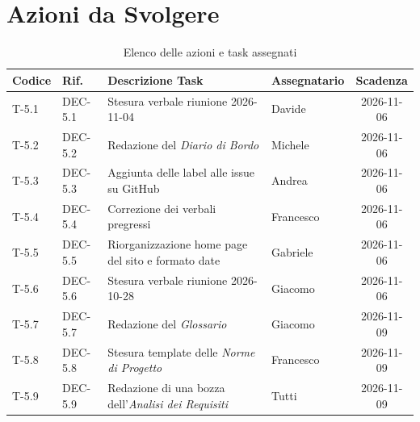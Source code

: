 \documentclass[11pt, a4paper]{article}
\begin{document}
\section{Azioni da Svolgere}

\begin{table}[htbp]
\centering
\caption{Elenco delle azioni e task assegnati}
\label{tab:azioni}
\begin{tabularx}{\textwidth}{l l X l c}
\toprule
\textbf{Codice} & \textbf{Rif.} & \textbf{Descrizione Task} & \textbf{Assegnatario} & \textbf{Scadenza} \\
\midrule
T-5.1 & DEC-5.1 & Stesura verbale riunione 2026-11-04 & Davide & 2026-11-06 \\
T-5.2 & DEC-5.2 & Redazione del \textit{Diario di Bordo} & Michele & 2026-11-06 \\
T-5.3 & DEC-5.3 & Aggiunta delle label alle issue su GitHub & Andrea & 2026-11-06 \\
T-5.4 & DEC-5.4 & Correzione dei verbali pregressi & Francesco & 2026-11-06 \\
T-5.5 & DEC-5.5 & Riorganizzazione home page del sito e formato date & Gabriele & 2026-11-06 \\
T-5.6 & DEC-5.6 & Stesura verbale riunione 2026-10-28 & Giacomo & 2026-11-06 \\
T-5.7 & DEC-5.7 & Redazione del \textit{Glossario} & Giacomo & 2026-11-09 \\
T-5.8 & DEC-5.8 & Stesura template delle \textit{Norme di Progetto} & Francesco & 2026-11-09 \\
T-5.9 & DEC-5.9 & Redazione di una bozza dell'\textit{Analisi dei Requisiti} & Tutti & 2026-11-09 \\
\bottomrule
\end{tabularx}
\end{table}
\end{document}
